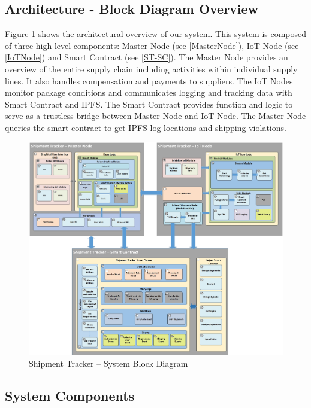 \subsection{Architecture - Block Diagram Overview}
Figure \ref{fig:ArchitectureBD} shows the architectural overview of our system. This system is composed of three high level components: Master Node (see \ref{MasterNode}), IoT Node (see \ref{IoTNode}) and Smart Contract (see \ref{ST-SC}). The Master Node provides an overview of the entire supply chain including activities within individual supply lines. It also handles compensation and payments to suppliers. The IoT Nodes monitor package conditions and communicates logging and tracking data with Smart Contract and IPFS. The Smart Contract provides function and logic to serve as a trustless bridge between Master Node and IoT Node. The Master Node queries the smart contract to get IPFS log locations and shipping violations.
\begin{figure}[h]
	\centering
    \includegraphics[width=180mm,scale=1]{figs/Blockdiagram}
	\caption{Shipment Tracker – System Block Diagram}
	\label{fig:ArchitectureBD} 
\end{figure}
\clearpage
\subsection{System Components} \label{SysComp} 

